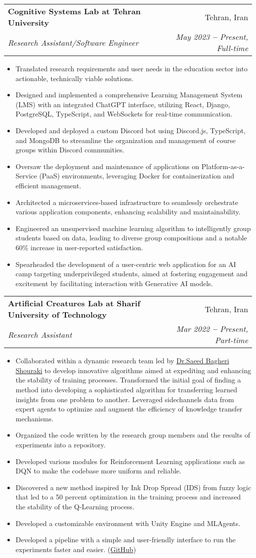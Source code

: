 \documentclass[letterpaper,11pt]{article}
\makeatletter
\newcommand{\resumeItem}[1]{
  \item\small{
    {#1 \vspace{-2pt}}
  }
}
\newcommand{\resumeSubheading}[4]{
  \vspace{-2pt}\item
    \begin{tabular*}{0.97\textwidth}[t]{l@{\extracolsep{\fill}}r}
      \textbf{#1} & #2 \\
      \textit{\small#3} & \textit{\small #4} \\
    \end{tabular*}\vspace{-7pt}
}
\newcommand{\resumeItemListStart}{\begin{itemize}}
\newcommand{\resumeItemListEnd}{\end{itemize}\vspace{-5pt}}
\makeatother
\begin{document}
\resumeSubheading
{Cognitive Systems Lab at Tehran University}{Tehran, Iran}
{Research Assistant/Software Engineer}{May 2023 \textbf{--} Present, Full-time}
\resumeItemListStart
\resumeItem{Translated research requirements and user needs in the education sector into actionable, technically viable solutions.}
\resumeItem{Designed and implemented a comprehensive Learning Management System (LMS) with an integrated ChatGPT interface, utilizing React, Django, PostgreSQL, TypeScript, and WebSockets for real-time communication.}
\resumeItem{Developed and deployed a custom Discord bot using Discord.js, TypeScript, and MongoDB to streamline the organization and management of course groups within Discord communities.}
\resumeItem{Oversaw the deployment and maintenance of applications on Platform-as-a-Service (PaaS) environments, leveraging Docker for containerization and efficient management.}
\resumeItem{Architected a microservices-based infrastructure to seamlessly orchestrate various application components, enhancing scalability and maintainability.}
\resumeItem{Engineered an unsupervised machine learning algorithm to intelligently group students based on data, leading to diverse group compositions and a notable 60\% increase in user-reported satisfaction.}
\resumeItem{Spearheaded the development of a user-centric web application for an AI camp targeting underprivileged students, aimed at fostering engagement and excitement by facilitating interaction with Generative AI models.}
\resumeItemListEnd

\resumeSubheading
{Artificial Creatures Lab at Sharif University of Technology}{Tehran, Iran}
{Research Assistant}{Mar 2022 \textbf{--} Present, Part-time}
\resumeItemListStart
\resumeItem{Collaborated within a dynamic research team led by \href{https://ee.sharif.edu/~bagheri-s/}{\color{blue}Dr.Saeed Bagheri Shouraki} to develop innovative algorithms aimed at expediting and enhancing the stability of training processes. Transformed the initial goal of finding a method into developing a sophisticated algorithm for transferring learned insights from one problem to another. Leveraged sidechannels data from expert agents to optimize and augment the efficiency of knowledge transfer mechanisms.}
\resumeItem{Organized the code written by the research group members and the results of experiments into a repository.}
\resumeItem{Developed various modules for Reinforcement Learning applications such as DQN to make the codebase more uniform and reliable.}
\resumeItem{Discovered a new method inspired by Ink Drop Spread (IDS) from fuzzy logic that led to a 50 percent optimization in the training process and increased the stability of the Q-Learning process.}
\resumeItem{Developed a customizable environment with Unity Engine and MLAgents.}
\resumeItem{Developed a pipeline with a simple and user-friendly interface to run the experiments faster and easier. (\href{https://github.com/alighandij/Ex-RL-virtual-lab}{\color{blue}GitHub})}
\resumeItemListEnd
\end{document}
